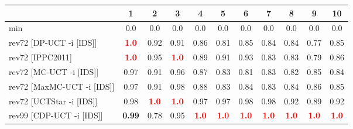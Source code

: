 \documentclass{article}
\begin{document}
\begin{tabular}{|l|r@{$\pm$}rr@{$\pm$}rr@{$\pm$}rr@{$\pm$}rr@{$\pm$}rr@{$\pm$}rr@{$\pm$}rr@{$\pm$}rr@{$\pm$}rr@{$\pm$}r|}
\hline

& \multicolumn{2}{c}{1}
& \multicolumn{2}{c}{2}
& \multicolumn{2}{c}{3}
& \multicolumn{2}{c}{4}
& \multicolumn{2}{c}{5}
& \multicolumn{2}{c}{6}
& \multicolumn{2}{c}{7}
& \multicolumn{2}{c}{8}
& \multicolumn{2}{c}{9}
& \multicolumn{2}{c|}{10}
\\
\hline
\hline
min
& \multicolumn{2}{c}{0.0}
& \multicolumn{2}{c}{0.0}
& \multicolumn{2}{c}{0.0}
& \multicolumn{2}{c}{0.0}
& \multicolumn{2}{c}{0.0}
& \multicolumn{2}{c}{0.0}
& \multicolumn{2}{c}{0.0}
& \multicolumn{2}{c}{0.0}
& \multicolumn{2}{c}{0.0}
& \multicolumn{2}{c|}{0.0}
\\
rev72 [DP-UCT -i [IDS]]
& \multicolumn{2}{c}{\textbf{\textcolor{red}{1.0}}}
& \multicolumn{2}{c}{0.92}
& \multicolumn{2}{c}{0.91}
& \multicolumn{2}{c}{0.86}
& \multicolumn{2}{c}{0.81}
& \multicolumn{2}{c}{0.85}
& \multicolumn{2}{c}{0.84}
& \multicolumn{2}{c}{0.84}
& \multicolumn{2}{c}{0.77}
& \multicolumn{2}{c|}{0.85}
\\
rev72 [IPPC2011]
& \multicolumn{2}{c}{\textbf{\textcolor{red}{1.0}}}
& \multicolumn{2}{c}{0.95}
& \multicolumn{2}{c}{\textbf{\textcolor{red}{1.0}}}
& \multicolumn{2}{c}{0.89}
& \multicolumn{2}{c}{0.91}
& \multicolumn{2}{c}{0.93}
& \multicolumn{2}{c}{0.83}
& \multicolumn{2}{c}{0.83}
& \multicolumn{2}{c}{0.79}
& \multicolumn{2}{c|}{0.86}
\\
rev72 [MC-UCT -i [IDS]]
& \multicolumn{2}{c}{0.97}
& \multicolumn{2}{c}{0.91}
& \multicolumn{2}{c}{0.96}
& \multicolumn{2}{c}{0.87}
& \multicolumn{2}{c}{0.83}
& \multicolumn{2}{c}{0.81}
& \multicolumn{2}{c}{0.83}
& \multicolumn{2}{c}{0.82}
& \multicolumn{2}{c}{0.85}
& \multicolumn{2}{c|}{0.84}
\\
rev72 [MaxMC-UCT -i [IDS]]
& \multicolumn{2}{c}{0.97}
& \multicolumn{2}{c}{0.91}
& \multicolumn{2}{c}{0.98}
& \multicolumn{2}{c}{0.88}
& \multicolumn{2}{c}{0.83}
& \multicolumn{2}{c}{0.84}
& \multicolumn{2}{c}{0.83}
& \multicolumn{2}{c}{0.84}
& \multicolumn{2}{c}{0.86}
& \multicolumn{2}{c|}{0.85}
\\
rev72 [UCTStar -i [IDS]]
& \multicolumn{2}{c}{0.98}
& \multicolumn{2}{c}{\textbf{\textcolor{red}{1.0}}}
& \multicolumn{2}{c}{\textbf{\textcolor{red}{1.0}}}
& \multicolumn{2}{c}{0.97}
& \multicolumn{2}{c}{0.97}
& \multicolumn{2}{c}{0.98}
& \multicolumn{2}{c}{0.98}
& \multicolumn{2}{c}{0.92}
& \multicolumn{2}{c}{0.89}
& \multicolumn{2}{c|}{0.92}
\\
\hline
rev99 [CDP-UCT -i [IDS]]
& \multicolumn{2}{c}{\textbf{0.99}}
& \multicolumn{2}{c}{0.78}
& \multicolumn{2}{c}{0.95}
& \multicolumn{2}{c}{\textbf{\textcolor{red}{1.0}}}
& \multicolumn{2}{c}{\textbf{\textcolor{red}{1.0}}}
& \multicolumn{2}{c}{\textbf{\textcolor{red}{1.0}}}
& \multicolumn{2}{c}{\textbf{\textcolor{red}{1.0}}}
& \multicolumn{2}{c}{\textbf{\textcolor{red}{1.0}}}
& \multicolumn{2}{c}{\textbf{\textcolor{red}{1.0}}}
& \multicolumn{2}{c|}{\textbf{\textcolor{red}{1.0}}}
\\
\hline
\end{tabular}%
\end{document}
